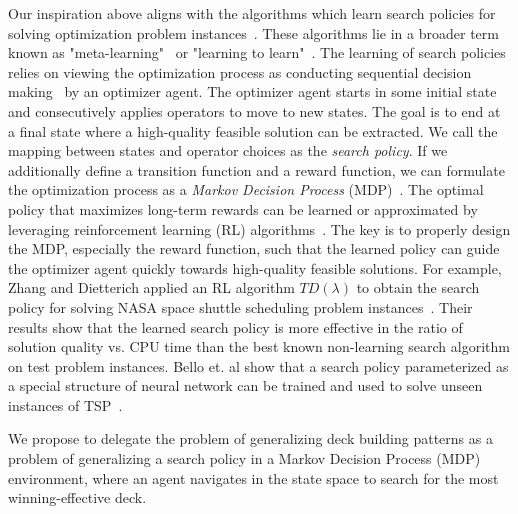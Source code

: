 Our inspiration above aligns with the algorithms which learn search policies for solving optimization problem instances~\cite{zoph2016neural,li2017learning,chenlearning,zhang2000solving}. These algorithms lie in a broader term known as "meta-learning"~\cite{lemke2015metalearning,brazdil2008metalearning,vilalta2002perspective} or "learning to learn"~\cite{thrun2012learning}. The learning of search policies relies on viewing the optimization process as conducting sequential decision making~\cite{littman1996algorithms} by an optimizer agent. The optimizer agent starts in some initial state and consecutively applies operators to move to new states. The goal is to end at a final state where a high-quality feasible solution can be extracted. We call the mapping between states and operator choices as the \textit{search policy}. If we additionally define a transition function and a reward function, we can formulate the optimization process as a \textit{Markov Decision Process} (MDP)~\cite{bellman1957markovian}. The optimal policy that maximizes long-term rewards can be learned or approximated by leveraging reinforcement learning (RL) algorithms~\cite{sutton1998reinforcement}. The key is to properly design the MDP, especially the reward function, such that the learned policy can guide the optimizer agent quickly towards high-quality feasible solutions. For example, Zhang and Dietterich applied an RL algorithm $TD(\lambda)$ to obtain the search policy for solving NASA space shuttle scheduling problem instances~\cite{zhang2000solving}. Their results show that the learned search policy is more effective in the ratio of solution quality vs. CPU time than the best known non-learning search algorithm on test problem instances. Bello et. al show that a search policy parameterized as a special structure of neural network can be trained and used to solve unseen instances of TSP~\cite{zoph2016neural}. 

We propose to delegate the problem of generalizing deck building patterns as a problem of generalizing a search policy in a Markov Decision Process (MDP)~\cite{bellman1957markovian} environment, where an agent navigates in the state space to search for the most winning-effective deck. 

